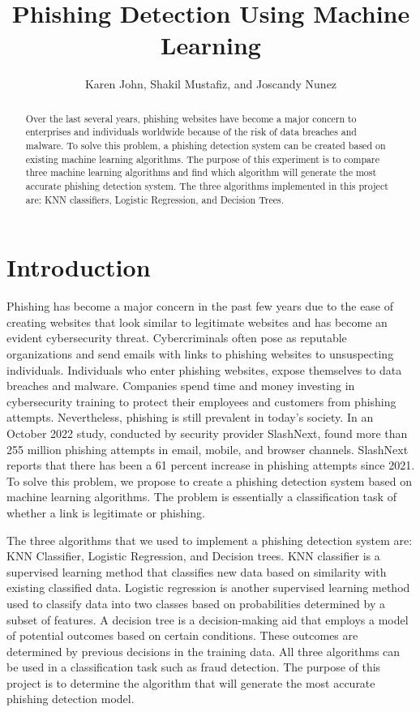 \documentclass[conference]{IEEEtran}
\begin{document}
\title{Phishing Detection Using Machine Learning}

\author{Karen John, Shakil Mustafiz, and Joscandy Nunez}


\maketitle


\begin{abstract}
Over the last several years, phishing websites have become a major concern to enterprises and individuals worldwide because of the risk of data breaches and malware. To solve this problem, a phishing detection system can be created based on existing machine learning algorithms. The purpose of this experiment is to compare three machine learning algorithms and find which algorithm will generate the most accurate phishing detection system. The three algorithms implemented in this project are: KNN classifiers, Logistic Regression, and Decision Trees. 

\end{abstract}

\section{Introduction}
Phishing has become a major concern in the past few years due to the ease of creating websites that look similar to legitimate websites and has become an evident cybersecurity threat. Cybercriminals often pose as reputable organizations and send emails with links to phishing websites to unsuspecting individuals. Individuals who enter phishing websites, expose themselves to data breaches and malware. Companies spend time and money investing in cybersecurity training to protect their employees and customers from phishing attempts. Nevertheless, phishing is still prevalent in today’s society. In an October 2022 study, conducted by security provider SlashNext, found more than 255 million phishing attempts in email, mobile, and browser channels. SlashNext reports that there has been a 61 percent increase in phishing attempts since 2021. To solve this problem, we propose to create a phishing detection system based on machine learning algorithms. The problem is essentially a classification task of whether a link is legitimate or phishing.  

The three algorithms that we used to implement a phishing detection system are: KNN Classifier, Logistic Regression, and Decision trees. KNN classifier is a supervised learning method that classifies new data based on similarity with existing classified data.  Logistic regression is another supervised learning method used to classify data into two classes based on probabilities determined by a subset of features. A decision tree is a decision-making aid that employs a model of potential outcomes based on certain conditions. These outcomes are determined by previous decisions in the training data. All three algorithms can be used in a classification task such as fraud detection. The purpose of this project is to determine the algorithm that will generate the most accurate phishing detection model. 
\end{document}
